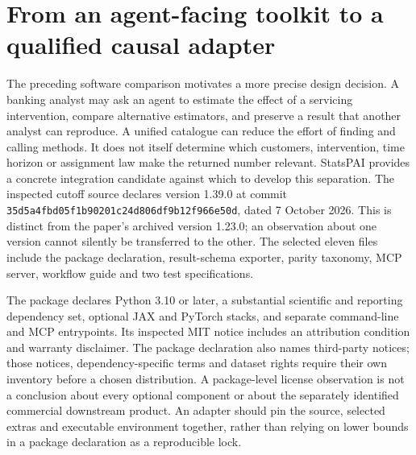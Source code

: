 \section{From an agent-facing toolkit to a qualified causal adapter}
\label{exec23:statspai-contract-scope}
The preceding software comparison motivates a more precise design decision.
A banking analyst may ask an agent to estimate the effect of a servicing
intervention, compare alternative estimators, and preserve a result that another
analyst can reproduce. A unified catalogue can reduce the effort of finding and
calling methods. It does not itself determine which customers, intervention,
time horizon or assignment law make the returned number relevant. StatsPAI
provides a concrete integration candidate against which to develop this
separation. The inspected cutoff source declares version 1.39.0 at commit
\texttt{35d5a4fbd05f1b90201c24d806df9b12f966e50d}, dated 7 October 2026.
This is distinct from the paper's archived version 1.23.0; an observation about
one version cannot silently be transferred to the other. The selected eleven
files include the package declaration, result-schema exporter, parity taxonomy,
MCP server, workflow guide and two test specifications.
\citep{exec23_statspai_contract,exec23_statspai_paper}

The package declares Python 3.10 or later, a substantial scientific and reporting
dependency set, optional JAX and PyTorch stacks, and separate command-line and
MCP entrypoints. Its inspected MIT notice includes an attribution condition and
warranty disclaimer. The package declaration also names third-party notices;
those notices, dependency-specific terms and dataset rights require their own
inventory before a chosen distribution. A package-level license observation
is not a conclusion about every optional component or about the separately
identified commercial downstream product. An adapter should pin the source,
selected extras and executable environment together, rather than relying on
lower bounds in a package declaration as a reproducible lock.
\citep{exec23_statspai_contract}

